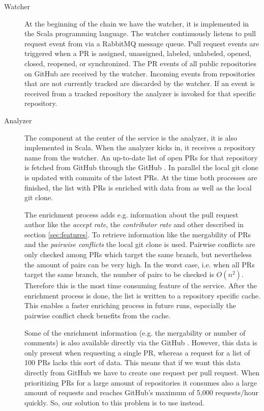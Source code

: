 \begin{description}
\item[Watcher]
At the beginning of the chain we have the watcher, it is implemented in the Scala programming language.
The watcher continuously listens to pull request event from \ghtorrent via a RabbitMQ message queue.
Pull request events are triggered when a PR is assigned, unassigned, labeled, unlabeled, opened, closed, reopened, or synchronized.
The PR events of all public repositories on GitHub are received by the watcher.
Incoming events from repositories that are not currently tracked are discarded by the watcher.
If an event is received from a tracked repository the analyzer is invoked for that specific repository.

\item[Analyzer]
The component at the center of the service is the analyzer, it is also implemented in Scala.
When the analyzer kicks in, it receives a repository name from the watcher.
An up-to-date list of open PRs for that repository is fetched from GitHub through the GitHub \api.
In parallel the local git clone is updated with commits of the latest PRs.
At the time both processes are finished, the list with PRs is enriched with data from \ghtorrent as well as the local git clone.

The enrichment process adds e.g. information about the pull request author like the \emph{accept rate}, the \emph{contributor rate} and other described in section \ref{sec:features}.
To retrieve information like the mergability of PRs and the \emph{pairwise conflicts} the local git clone is used.
Pairwise conflicts are only checked among PRs which target the same branch, but nevertheless the amount of pairs can be very high.
In the worst case, i.e. when all PRs target the same branch, the number of pairs to be checked is $O(n^2)$.
Therefore this is the most time consuming feature of the service.
After the enrichment process is done, the list is written to a repository specific cache.
This enables a faster enriching process in future runs, especially the pairwise conflict check benefits from the cache.

Some of the enrichment information (e.g. the mergability or number of comments) is also available directly via the GitHub \api.
However, this data is only present when requesting a single PR, whereas a request for a list of 100 PRs lacks this sort of data.
This means that if we want this data directly from GitHub we have to create one \api request per pull request.
When prioritizing PRs for a large amount of repositories it consumes also a large amount of \api requests and reaches GitHub's maximum of 5,000 requests/hour quickly.
So, our solution to this problem is to use \ghtorrent instead.


\end{description}
